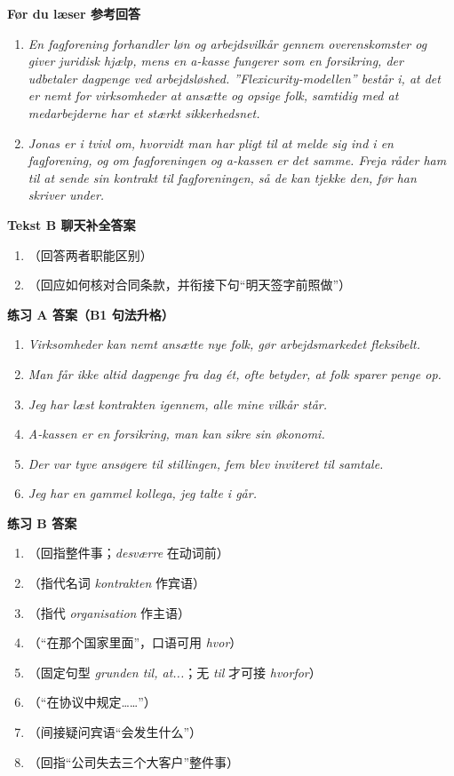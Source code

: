 \begin{answerbox}
\textbf{Før du læser 参考回答}
\begin{enumerate}
  \item \textit{En fagforening forhandler løn og arbejdsvilkår gennem overenskomster og giver juridisk hjælp, mens en a-kasse fungerer som en forsikring, der udbetaler dagpenge ved arbejdsløshed. ”Flexicurity-modellen” består i, at det er nemt for virksomheder at ansætte og opsige folk, samtidig med at medarbejderne har et stærkt sikkerhedsnet.}
  \item \textit{Jonas er i tvivl om, hvorvidt man har pligt til at melde sig ind i en fagforening, og om fagforeningen og a-kassen er det samme. Freja råder ham til at sende sin kontrakt til fagforeningen, så de kan tjekke den, før han skriver under.}
\end{enumerate}

\textbf{Tekst B 聊天补全答案}
\begin{enumerate}
  \item {}（回答两者职能区别）
  \item {}（回应如何核对合同条款，并衔接下句“明天签字前照做”）
\end{enumerate}

\textbf{练习 A 答案（B1 句法升格）}
\begin{enumerate}
  \item \textit{Virksomheder kan nemt ansætte nye folk,  gør arbejdsmarkedet fleksibelt.}
  \item \textit{Man får ikke altid dagpenge fra dag ét,  ofte betyder, at folk sparer penge op.}
  \item \textit{Jeg har læst kontrakten igennem,  alle mine vilkår står.}
  \item \textit{A-kassen er en forsikring,  man kan sikre sin økonomi.}
  \item \textit{Der var tyve ansøgere til stillingen,  fem blev inviteret til samtale.}
  \item \textit{Jeg har en gammel kollega,  jeg talte  i går.}
\end{enumerate}

\textbf{练习 B 答案}
\begin{enumerate}
  \item {}（回指整件事；\textit{desværre} 在动词前）
  \item {}（指代名词 \textit{kontrakten} 作宾语）
  \item {}（指代 \textit{organisation} 作主语）
  \item {}（“在那个国家里面”，口语可用 \textit{hvor}）
  \item {}（固定句型 \textit{grunden til, at...}；无 \textit{til} 才可接 \textit{hvorfor}）
  \item {}（“在协议中规定……”）
  \item {}（间接疑问宾语“会发生什么”）
  \item {}（回指“公司失去三个大客户”整件事）
\end{enumerate}


\end{answerbox}
